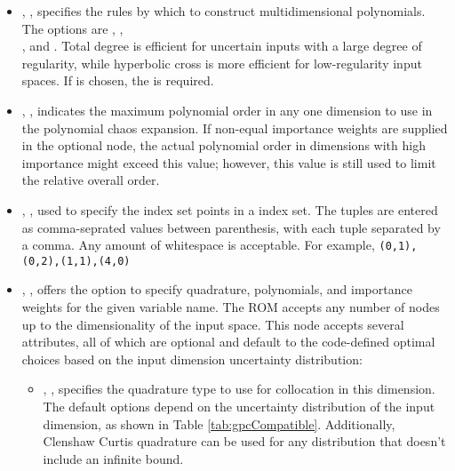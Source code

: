 \begin{itemize}
  \item {}, ,
  specifies the rules by which to construct multidimensional polynomials.  The options are
  , ,\\
  , and .
  Total degree is efficient for
  uncertain inputs with a large degree of regularity, while hyperbolic cross is more efficient
  for low-regularity input spaces.
  If  is chosen, the  is required.
  \item {}, ,
  indicates the maximum polynomial order in any one dimension to use in the
  polynomial chaos expansion. \nb If non-equal importance weights are supplied in the optional
   node, the actual polynomial order in dimensions with high
  importance might exceed this value; however, this value is still used to limit the
  relative overall order.
  \item {}, ,
  used to specify the index set points in a  index set.  The tuples are
  entered as comma-seprated values between parenthesis, with each tuple separated by a comma.
  Any amount of whitespace is acceptable.  For example, \verb'(0,1),(0,2),(1,1),(4,0)'
  \item {}, ,
  offers the option to specify quadrature, polynomials, and importance weights for the given
  variable name.  The ROM accepts any number of  nodes up to the
  dimensionality of the input space.  This node accepts several attributes, all of which are
  optional and default to
  the code-defined optimal choices based on the input dimension uncertainty distribution:
  \begin{itemize}
    \item {}, ,
      specifies the quadrature type to use for collocation in this dimension.  The default options
      depend on the uncertainty distribution of the input dimension, as shown in Table
      \ref{tab:gpcCompatible}. Additionally, Clenshaw Curtis quadrature can be used for any
      distribution that doesn't include an infinite bound.

\end{itemize}
\end{itemize}
